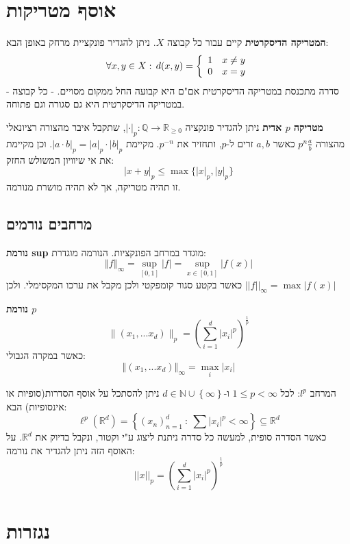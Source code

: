 \documentclass{tstextbook}
\begin{document}
\section{אוסף מטריקות}

\textbf{המטריקה הדיסקרטית}
קיים עבור כל קבוצה \(X\). ניתן להגדיר פונקציית מרחק באופן הבא:
$$\forall x,y\in X:\,d(x,y)={\left\{\begin{array}{l l}{1}&{x\neq y}\\ {0}&{x=y}\end{array}\right.}$$
- סדרה מתכנסת במטריקה הדיסקרטית אם"ם היא קבועה החל ממקום מסויים.
- כל קבוצה במטריקה הדיסקרטית היא גם סגורה וגם פתוחה.

\textbf{מטריקה \(p\) אדית}
ניתן להגדיר פונקציה \(|\cdot|_{p}:\mathbb{Q}\to \mathbb{R}_{\geq 0}\), שתקבל איבר מהצורה רציונאלי מהצורה \(p^n \frac{a}{b}\) כאשר \(a,b\) זרים ל-\(p\), ותחזיר את \(p^{-n}\). מקיימת \(|a\cdot b|_{p}=|a|_{p}\cdot |b|_{p}\). וכן מקיימת את אי שיוויון המשולש החזק:
$$|x+y|_{p}\leq \max \{ |x|_{p},|y|_{p} \}$$
זו תהיה מטריקה, אך לא תהיה מושרת מנורמה.

\subsection{מרחבים נורמים}

\textbf{נורמת sup}
מוגדר במרחב הפונקציות. הנורמה מוגדרת:
$$\left\Vert{f}\right\Vert_{\infty}=\operatorname*{sup}_{[0,1]}\left\vert{f}\right\vert=\operatorname*{sup}_{x\in[0,1]}\left\vert{f}\left(x\right)\right\vert$$
כאשר בקטע סגור קומפקטי ולכן מקבל את ערכו המקסימלי. ולכן \(||f||_{\infty}=\max|f(x)|\)

\textbf{נורמת \(p\)}$$\|(x_{1},...x_{d})\|_{p}=\left(\sum_{i=1}^{d}|x_{i}|^{p}\right)^{\frac{1}{p}}$$
כאשר במקרה הגבולי:
$$\left\Vert(x_{1},...x_{d})\right\Vert_{\infty}=\operatorname*{max}_{i}\left\vert x_{i}\right\vert$$

המרחב \(l^p\):
לכל \(1\leq p<\infty\) ו-\(d\in\mathbb{N}\cup \left\{  \infty  \right\}\) ניתן להסתכל על אוסף הסדרות(סופיות או אינסופיות) הבא:
$$\ell^{p}\left(\mathbb{R}^{d}\right)=\left\{\left(x_{n}\right)_{n=1}^{d}\ :\ \sum|x_{i}|^{p}<\infty\right\}\subseteq\mathbb{R}^{d}$$
כאשר הסדרה סופית, למעשה כל סדרה ניתנת ליצוג ע"י וקטור, ונקבל בדיוק את \(\mathbb{R}^d\). על האוסף הזה ניתן להגדיר את נורמה:
$$||x||_{p}=\left(\sum_{i=1}^{d}|x_{i}|^{p}\right)^{\frac{1}{p}}$$


\section{נגזרות}
\end{document}
